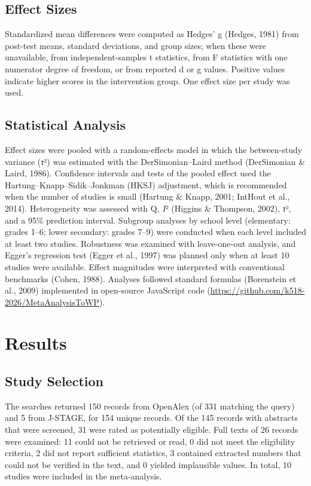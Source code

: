 \documentclass[man,a4paper,12pt,floatsintext,nolmodern,notab]{apa7}
\begin{document}
\subsection{Effect Sizes}
Standardized mean differences were computed as Hedges’ g (Hedges, 1981) from post-test means, standard deviations, and group sizes; when these were unavailable, from independent-samples t statistics, from F statistics with one numerator degree of freedom, or from reported d or g values. Positive values indicate higher scores in the intervention group. One effect size per study was used.

\subsection{Statistical Analysis}
Effect sizes were pooled with a random-effects model in which the between-study variance (\textit{τ}²) was estimated with the DerSimonian–Laird method (DerSimonian \& Laird, 1986). Confidence intervals and tests of the pooled effect used the Hartung–Knapp–Sidik–Jonkman (HKSJ) adjustment, which is recommended when the number of studies is small (Hartung \& Knapp, 2001; IntHout et al., 2014). Heterogeneity was assessed with Q, \textit{I}² (Higgins \& Thompson, 2002), \textit{τ}², and a 95\% prediction interval. Subgroup analyses by school level (elementary: grades 1–6; lower secondary: grades 7–9) were conducted when each level included at least two studies. Robustness was examined with leave-one-out analysis, and Egger’s regression test (Egger et al., 1997) was planned only when at least 10 studies were available. Effect magnitudes were interpreted with conventional benchmarks (Cohen, 1988). Analyses followed standard formulas (Borenstein et al., 2009) implemented in open-source JavaScript code (\url{https://github.com/k518-2026/MetaAnalysisToWP}).

\section{Results}
\subsection{Study Selection}
The searches returned 150 records from OpenAlex (of 331 matching the query) and 5 from J-STAGE, for 154 unique records. Of the 145 records with abstracts that were screened, 31 were rated as potentially eligible. Full texts of 26 records were examined: 11 could not be retrieved or read, 0 did not meet the eligibility criteria, 2 did not report sufficient statistics, 3 contained extracted numbers that could not be verified in the text, and 0 yielded implausible values. In total, 10 studies were included in the meta-analysis.
\end{document}
